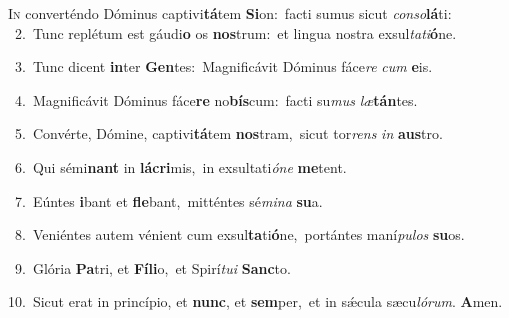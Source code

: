 \lettrine{\initial\textcolor{\initialcolor}{I}}{n} converténdo Dóminus captivi\-\textbf{tá}\-tem \textbf{Si}\-on:~\star facti sumus sicut \textit{con}\-\textit{so}\textbf{lá}ti:\\
{\numbfont\textcolor{\numbcolor}{~2.}}~Tunc replétum est gáudi\textbf{o} os \textbf{nos}\-trum:~\star et lingua nostra exsul\-\textit{ta}\-\textit{ti}\textbf{ó}ne.\par
{\numbfont\textcolor{\numbcolor}{~3.}}~Tunc dicent \textbf{in}\-ter \textbf{Gen}\-tes:~\star Magnificávit Dóminus fáce\textit{re} \textit{cum} \textbf{e}\-is.\par
{\numbfont\textcolor{\numbcolor}{~4.}}~Magnificávit Dóminus fáce\textbf{re} no\-\textbf{bís}\-cum:~\star facti su\textit{mus} \textit{læ}\-\textbf{tán}tes.\par
{\numbfont\textcolor{\numbcolor}{~5.}}~Convérte, Dómine, captivi\-\textbf{tá}\-tem \textbf{nos}\-tram,~\star sicut tor\textit{rens} \textit{in} \textbf{aus}\-tro.\par
{\numbfont\textcolor{\numbcolor}{~6.}}~Qui sémi\textbf{nant} in \textbf{lá}\-\textbf{cri}mis,~\star in exsultati\-\textit{ó}\-\textit{ne} \textbf{me}\-tent.\par
{\numbfont\textcolor{\numbcolor}{~7.}}~Eúntes \textbf{i}\-bant et \textbf{fle}\-bant,~\star mitténtes sé\-\textit{mi}\-\textit{na} \textbf{su}\-a.\par
{\numbfont\textcolor{\numbcolor}{~8.}}~Veniéntes autem vénient cum exsul\-\textbf{ta}\-ti\-\textbf{ó}\-ne,~\star portántes maní\-\textit{pu}\-\textit{los} \textbf{su}\-os.\par
{\numbfont\textcolor{\numbcolor}{~9.}}~Glória \textbf{Pa}\-tri, et \textbf{Fí}\-\textbf{li}o,~\star et Spirí\-\textit{tu}\-\textit{i} \textbf{Sanc}\-to.\par
{\numbfont\textcolor{\numbcolor}{10.}}~Sicut erat in princípio, et \textbf{nunc}\-, et \textbf{sem}\-per,~\star et in sǽcula sæcu\-\textit{ló}\-\textit{rum}. \textbf{A}\-men.\par

